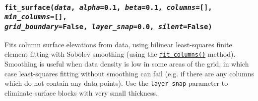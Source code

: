 \begin{snugshade}\subsubsection{\texttt{fit\_surface(\emph{data}, \emph{alpha}=0.1, \emph{beta}=0.1, \emph{columns}=[], \emph{min\_columns}=[], \\
    \emph{grid\_boundary}=False, \emph{layer\_snap}=0.0, \emph{silent}=False)}}\end{snugshade}
\label{sec:mulgrid:fit_surface}

Fits column surface elevations from data, using bilinear least-squares finite element fitting with Sobolev smoothing (using the \hyperref[sec:mulgrid:fit_columns]{\texttt{fit\_columns()}} method).  Smoothing is useful when data density is low in some areas of the grid, in which case least-squares fitting without smoothing can fail (e.g. if there are any columns which do not contain any data points). Use the \texttt{layer\_snap} parameter to eliminate surface blocks with very small thickness.

